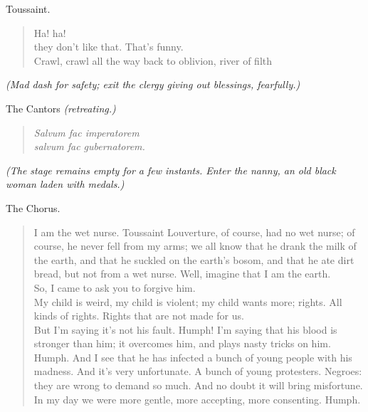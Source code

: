 \documentclass[letterpaper,article,12pt,oneside,notitlepage]{memoir}
\begin{document}
\begin{center}Toussaint.\end{center}

\begin{verse}
Ha! ha! \\
they don't like that. That's funny. \\
Crawl, crawl all the way back to oblivion, river of filth \\
\end{verse}

\textit{(Mad dash for safety; exit the clergy giving out blessings, fearfully.)}

\begin{center}The Cantors \textit{(retreating.)}\end{center}

\begin{verse}
\textit{Salvum fac imperatorem} \\
\textit{salvum fac gubernatorem.} \\
\end{verse}

\textit{(The stage remains empty for a few instants. Enter the nanny, an old black woman laden with medals.)}

\begin{center}The Chorus.\end{center}

\begin{verse}
I am the wet nurse. Toussaint Louverture, of course, had no wet nurse; of course, he never fell from my arms; we all know that he drank the milk of the earth, and that he suckled on the earth's bosom, and that he ate dirt bread, but not from a wet nurse. Well, imagine that I am the earth. \\
So, I came to ask you to forgive him. \\
My child is weird, my child is violent; my child wants more; rights. All kinds of rights. Rights that are not made for us. \\
But I'm saying it's not his fault. Humph! I'm saying that his blood is stronger than him; it overcomes him, and plays nasty tricks on him. Humph. And I see that he has infected a bunch of young people with his madness. And it's very unfortunate. A bunch of young protesters. Negroes: they are wrong to demand so much. And no doubt it will bring misfortune. In my day we were more gentle, more accepting, more consenting. Humph. \\
\end{verse}
\end{document}
